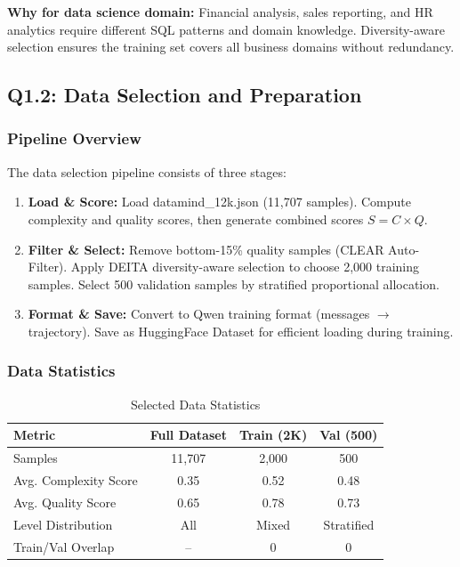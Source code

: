 \documentclass[12pt,a4paper]{article}
\begin{document}
\textbf{Why for data science domain:} Financial analysis, sales reporting, and HR analytics require different SQL patterns and domain knowledge. Diversity-aware selection ensures the training set covers all business domains without redundancy.

\subsection{Q1.2: Data Selection and Preparation}

\subsubsection{Pipeline Overview}

The data selection pipeline consists of three stages:

\begin{enumerate}[leftmargin=*]
    \item \textbf{Load \& Score:} Load datamind\_12k.json (11,707 samples). Compute complexity and quality scores, then generate combined scores $S = C \times Q$.
    \item \textbf{Filter \& Select:} Remove bottom-15\% quality samples (CLEAR Auto-Filter). Apply DEITA diversity-aware selection to choose 2,000 training samples. Select 500 validation samples by stratified proportional allocation.
    \item \textbf{Format \& Save:} Convert to Qwen training format (messages $\rightarrow$ trajectory). Save as HuggingFace Dataset for efficient loading during training.
\end{enumerate}

\subsubsection{Data Statistics}

\begin{table}[H]
\centering
\caption{Selected Data Statistics}
\begin{tabular}{lccc}
\toprule
\textbf{Metric} & \textbf{Full Dataset} & \textbf{Train (2K)} & \textbf{Val (500)} \\
\midrule
Samples & 11,707 & 2,000 & 500 \\
Avg. Complexity Score & 0.35 & 0.52 & 0.48 \\
Avg. Quality Score & 0.65 & 0.78 & 0.73 \\
Level Distribution & All & Mixed & Stratified \\
Train/Val Overlap & -- & 0 & 0 \\
\bottomrule
\end{tabular}
\end{table}
\end{document}
